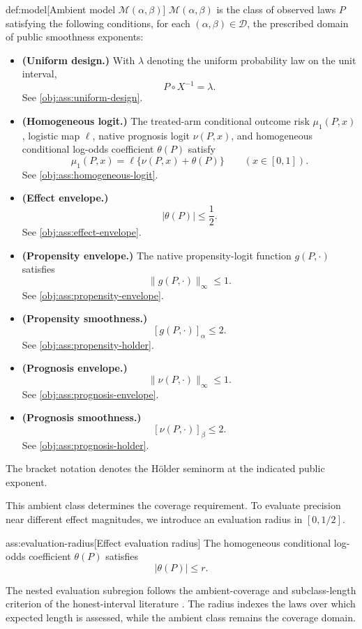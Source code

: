 \begin{definitionv}{def:model}[Ambient model \(\mathcal M(\alpha,\beta)\)]
\(\mathcal M(\alpha,\beta)\) is the class of observed laws \(P\) satisfying the following conditions, for each \((\alpha,\beta)\in\mathcal D\), the prescribed domain of public smoothness exponents:
\begin{itemize}
\item \textbf{(Uniform design.)} With \(\lambda\) denoting the uniform probability law on the unit interval,
\[
P\circ X^{-1}=\lambda.
\]
See \cref{obj:ass:uniform-design}.
\item \textbf{(Homogeneous logit.)} The treated-arm conditional outcome risk \(\mu_1(P,x)\), logistic map \(\ell\), native prognosis logit \(\nu(P,x)\), and homogeneous conditional log-odds coefficient \(\theta(P)\) satisfy
\[
\mu_1(P,x)=\ell\{\nu(P,x)+\theta(P)\}
\qquad (x\in[0,1]).
\]
See \cref{obj:ass:homogeneous-logit}.
\item \textbf{(Effect envelope.)}
\[
|\theta(P)|\le \frac12.
\]
See \cref{obj:ass:effect-envelope}.
\item \textbf{(Propensity envelope.)} The native propensity-logit function \(g(P,\cdot)\) satisfies
\[
\|g(P,\cdot)\|_\infty\le 1.
\]
See \cref{obj:ass:propensity-envelope}.
\item \textbf{(Propensity smoothness.)}
\[
[g(P,\cdot)]_\alpha\le 2.
\]
See \cref{obj:ass:propensity-holder}.
\item \textbf{(Prognosis envelope.)}
\[
\|\nu(P,\cdot)\|_\infty\le 1.
\]
See \cref{obj:ass:prognosis-envelope}.
\item \textbf{(Prognosis smoothness.)}
\[
[\nu(P,\cdot)]_\beta\le 2.
\]
See \cref{obj:ass:prognosis-holder}.
\end{itemize}
The bracket notation denotes the Hölder seminorm at the indicated public exponent.
\end{definitionv}

This ambient class determines the coverage requirement. To evaluate precision near different effect magnitudes, we introduce an evaluation radius  in \([0,1/2]\).

\begin{assumptionv}{ass:evaluation-radius}[Effect evaluation radius]
The homogeneous conditional log-odds coefficient \(\theta(P)\) satisfies
\[
|\theta(P)|\le r.
\]
\end{assumptionv}

The nested evaluation subregion follows the ambient-coverage and subclass-length criterion of the honest-interval literature \citep{CaiLow2004ConfidenceAdaptation}. The radius indexes the laws over which expected length is assessed, while the ambient class remains the coverage domain.


